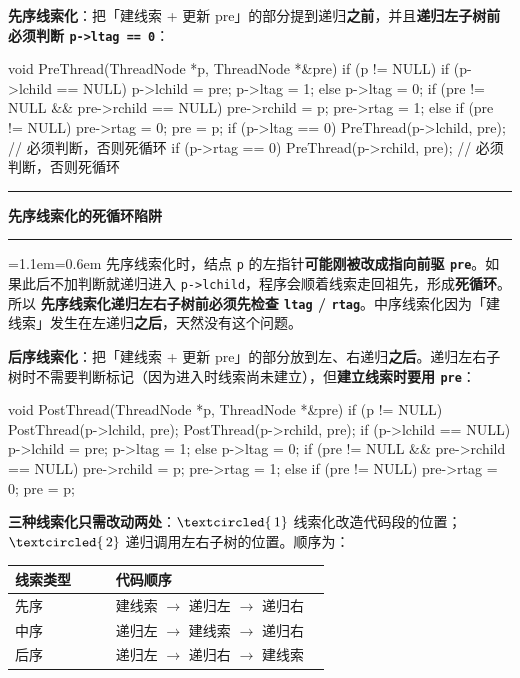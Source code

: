 \documentclass[11pt,openany,UTF8]{ctexbook}
\newcommand{\circled}[1]{\textcircled{\scriptsize\,#1}}
\newcommand{\callouthead}[2]{%
  \par\addvspace{7pt}\noindent
  {\color{#1}\rule[-0.15em]{3pt}{1.05em}}\hspace{0.5em}%
  {\bfseries\color{#1}#2}\par\nobreak\vspace{-0.35em}%
  {\color{rulesep}\hrule height 0.4pt}\nobreak\vspace{0.45em}%
  \begingroup\small\setlength{\parindent}{0pt}%
  \leftskip=1.1em\rightskip=0.6em\noindent\ignorespaces}
\newcommand{\calloutend}{\par\endgroup\addvspace{7pt}}
\newenvironment{callwarn}[1]{\callouthead{warnbar}{#1}}{\calloutend}
\begin{document}
\textbf{先序线索化}：把「建线索 + 更新 pre」的部分提到递归\textbf{之前}，并且\textbf{递归左子树前必须判断 \texttt{p->\allowbreak{}ltag =\allowbreak{}=\allowbreak{} 0}}：

\begin{codebox}
void PreThread(ThreadNode *p, ThreadNode *&pre) {
    if (p != NULL) {
        if (p->lchild == NULL) { p->lchild = pre; p->ltag = 1; }
        else { p->ltag = 0; }
        if (pre != NULL && pre->rchild == NULL) { pre->rchild = p; pre->rtag = 1; }
        else if (pre != NULL) { pre->rtag = 0; }
        pre = p;
        if (p->ltag == 0) PreThread(p->lchild, pre);  // 必须判断，否则死循环
        if (p->rtag == 0) PreThread(p->rchild, pre);  // 必须判断，否则死循环
    }
}
\end{codebox}

\begin{callwarn}{先序线索化的死循环陷阱}
先序线索化时，结点 \texttt{p} 的左指针\textbf{可能刚被改成指向前驱 \texttt{pre}}。如果此后不加判断就递归进入 \texttt{p->\allowbreak{}lchild}，程序会顺着线索走回祖先，形成\textbf{死循环}。所以 \textbf{先序线索化递归左右子树前必须先检查 \texttt{ltag} / \texttt{rtag}}。中序线索化因为「建线索」发生在左递归\textbf{之后}，天然没有这个问题。

\end{callwarn}

\textbf{后序线索化}：把「建线索 + 更新 pre」的部分放到左、右递归\textbf{之后}。递归左右子树时不需要判断标记（因为进入时线索尚未建立），但\textbf{建立线索时要用 \texttt{pre}}：

\begin{codebox}
void PostThread(ThreadNode *p, ThreadNode *&pre) {
    if (p != NULL) {
        PostThread(p->lchild, pre);
        PostThread(p->rchild, pre);
        if (p->lchild == NULL) { p->lchild = pre; p->ltag = 1; }
        else { p->ltag = 0; }
        if (pre != NULL && pre->rchild == NULL) { pre->rchild = p; pre->rtag = 1; }
        else if (pre != NULL) { pre->rtag = 0; }
        pre = p;
    }
}
\end{codebox}

\textbf{三种线索化只需改动两处}：$\circled{1}$ 线索化改造代码段的位置；$\circled{2}$ 递归调用左右子树的位置。顺序为：

\begingroup\small\setlength{\tabcolsep}{4.0pt}
\begin{longtable}{@{}L{0.3004\linewidth}L{0.6453\linewidth}@{}}
\toprule
\textbf{线索类型} & \textbf{代码顺序} \\
\midrule
\endhead
先序 & 建线索 $\to$ 递归左 $\to$ 递归右 \\
中序 & 递归左 $\to$ 建线索 $\to$ 递归右 \\
后序 & 递归左 $\to$ 递归右 $\to$ 建线索 \\
\bottomrule
\end{longtable}
\endgroup
\end{document}
